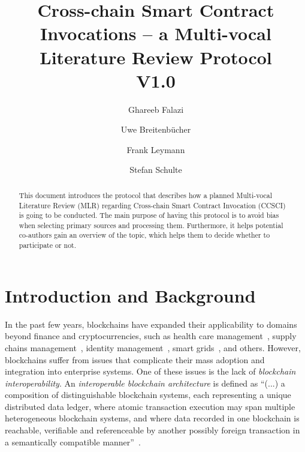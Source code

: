 \documentclass[review]{elsarticle}
\begin{document}
\begin{frontmatter}

\title{Cross-chain Smart Contract Invocations -- a Multi-vocal Literature Review Protocol\\V1.0}
\author[iaas]{Ghareeb Falazi}
\author[iaas]{Uwe Breitenb\"ucher}
\author[iaas]{Frank Leymann}
\author[tuhh]{Stefan Schulte}
\address[iaas]{Institute of Architecture of Application Systems, University of Stuttgart\\Universit\"atsstra\ss{}e 38, 70569 Stuttgart}
\address[tuhh]{Institute of Data Engineering, Hamburg University of Technology\\Am Schwarzenberg-Campus 3, 21073 Hamburg}


\begin{abstract}
This document introduces the protocol that describes how a planned Multi-vocal Literature Review (MLR) regarding Cross-chain Smart Contract Invocation (CCSCI) is going to be conducted.
The main purpose of having this protocol is to avoid bias when selecting primary sources and processing them.
Furthermore, it helps potential co-authors gain an overview of the topic, which helps them to decide whether to participate or not.
\end{abstract}


\end{frontmatter}

\tableofcontents

\linenumbers

\section{Introduction and Background}
\label{sec:introduction-and-background}
In the past few years, blockchains have expanded their applicability to domains beyond finance and cryptocurrencies, such as health care management~\cite{Tuli2020Healthcare}, supply chains management~\cite{Montecchi2019SupplyChains}, identity management~\cite{Zhu2018IdentityManagement}, smart grids~\cite{Pop2018SmartGrid}, and others.
However, blockchains suffer from issues that complicate their mass adoption and integration into enterprise systems.
One of these issues is the lack of \emph{blockchain interoperability}.
An \emph{interoperable blockchain architecture} is defined as \enquote{(...) a composition of distinguishable blockchain systems, each representing a unique distributed data ledger, where atomic transaction execution may span multiple heterogeneous blockchain systems, and where data recorded in one blockchain is reachable, verifiable and referenceable by another possibly foreign transaction in a semantically compatible manner}~\cite{Hardjon2020Interoperability}.
\end{document}
